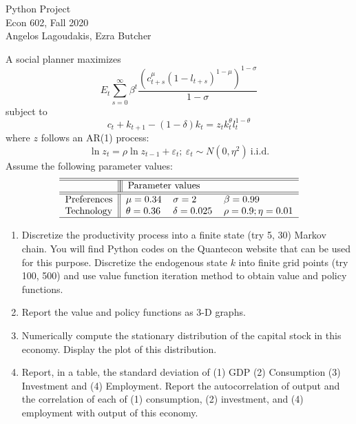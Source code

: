 \documentclass[12pt]{article}
\begin{document}
\begin{doublespace}

\begin{center}
\LARGE{Python Project}\\
\large{Econ 602, Fall 2020}\\
\large{Angelos Lagoudakis, Ezra Butcher}\\
\end{center}

A social planner maximizes%
\[
E_{t}\sum_{s=0}^{\infty }\beta ^{t}\frac{\left( c_{t+s}^{\mu }\left(
1-l_{t+s}\right) ^{1-\mu }\right) ^{1-\sigma }}{1-\sigma } 
\]%
subject to%
\[
c_{t}+k_{t+1}-\left( 1-\delta \right) k_{t}=z_{t}k_{t}^{\theta
}l_{t}^{1-\theta } 
\]%
where $z$ follows an AR(1) process:%
\[
\ln z_{t}=\rho \ln z_{t-1}+\varepsilon _{t};  \ \varepsilon _{t}\sim N\left(
0,\eta ^{2}\right) ~\mbox{i.i.d.} 
\]%
Assume the following parameter values:%
\[
\begin{tabular}{l||lll}
\hline\hline
& \multicolumn{3}{||l}{Parameter values} \\ \hline\hline
Preferences & $\mu =0.34$ & $\sigma =2$ & $\beta =0.99$ \\ 
Technology & $\theta =0.36$ & $\delta =0.025$ & $\rho =0.9;\eta =0.01$ \\ 
\hline
\end{tabular}%
\]

\begin{enumerate}
\item Discretize the productivity process into a finite state (try 5, 30)
Markov chain. You will find Python codes on the Quantecon website that can
be used for this purpose. Discretize the endogenous state $k$ into finite
grid points (try 100, 500) and use value function iteration method to obtain
value and policy functions.
\\

\item Report the value and policy functions as 3-D graphs.
\\

\item Numerically compute the stationary distribution of the capital stock
in this economy. Display the plot of this distribution.
\\

\item Report, in a table, the standard deviation of (1) GDP (2) Consumption
(3) Investment and (4) Employment. Report the autocorrelation of output and
the correlation of each of (1) consumption, (2) investment, and (4)
employment with output of this economy.
\end{enumerate}


\end{doublespace}
\end{document}
